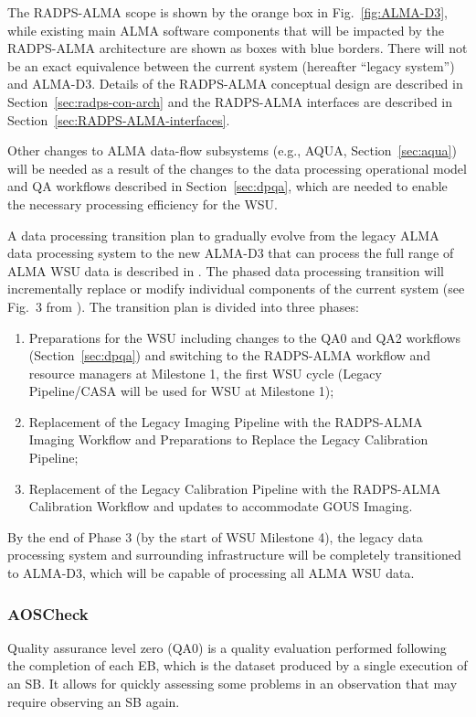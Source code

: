 The RADPS-ALMA scope is shown by the orange box in Fig.~\ref{fig:ALMA-D3}, while existing main ALMA software components that will be impacted by the RADPS-ALMA architecture are shown as
boxes with blue borders. There will not be an exact equivalence between the current system (hereafter “legacy system”) and ALMA-D3. Details of the RADPS-ALMA conceptual design are described in Section~\ref{sec:radps-con-arch} and the RADPS-ALMA interfaces are described in Section~\ref{sec:RADPS-ALMA-interfaces}.


Other changes to ALMA data-flow subsystems (e.g., AQUA, Section~\ref{sec:aqua}) will be needed as a result of the changes to the data processing operational model and \ac{QA} workflows described in Section~\ref{sec:dpqa}, which are needed to enable the necessary processing efficiency for the WSU.

A data processing transition plan to gradually evolve from the legacy ALMA data processing system to the new ALMA-D3 that can process the full range of ALMA WSU data is described in \cite{dp_tp}. The phased data processing transition will incrementally replace or modify individual components of the current system (see Fig.~3 from \cite{dp_tp}). The transition plan is divided into three phases:
\begin{enumerate}
    \item Preparations for the WSU including changes to the QA0 and QA2 workflows (Section~\ref{sec:dpqa}) and switching to the RADPS-ALMA workflow and resource managers at Milestone 1, the first WSU cycle (Legacy Pipeline/CASA will be used for WSU at Milestone 1);
    \item Replacement of the Legacy Imaging Pipeline with the RADPS-ALMA Imaging Workflow and Preparations to Replace the Legacy Calibration Pipeline;
    \item Replacement of the Legacy Calibration Pipeline with the RADPS-ALMA Calibration Workflow and updates to accommodate GOUS Imaging.
\end{enumerate}
By the end of Phase 3 (by the start of WSU Milestone 4), the legacy data processing system and surrounding infrastructure will be completely transitioned to ALMA-D3, which will be capable of processing all ALMA WSU data.


\subsubsection{AOSCheck}
\label{sec:aoscheck}
Quality assurance level zero (QA0) is a quality evaluation performed following the completion of each EB, which is the dataset produced by a single execution of an SB. It allows for quickly assessing some problems in an observation that may require observing an SB again.

